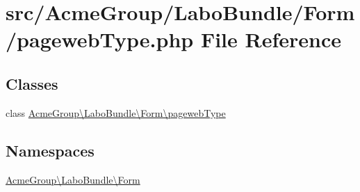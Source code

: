 \hypertarget{pageweb_type_8php}{\section{src/\+Acme\+Group/\+Labo\+Bundle/\+Form/pageweb\+Type.php File Reference}
\label{pageweb_type_8php}
}
\subsection*{Classes}
\begin{DoxyCompactItemize}
\item 
class \hyperlink{class_acme_group_1_1_labo_bundle_1_1_form_1_1pageweb_type}{Acme\+Group\textbackslash{}\+Labo\+Bundle\textbackslash{}\+Form\textbackslash{}pageweb\+Type}
\end{DoxyCompactItemize}
\subsection*{Namespaces}
\begin{DoxyCompactItemize}
\item 
 \hyperlink{namespace_acme_group_1_1_labo_bundle_1_1_form}{Acme\+Group\textbackslash{}\+Labo\+Bundle\textbackslash{}\+Form}
\end{DoxyCompactItemize}
